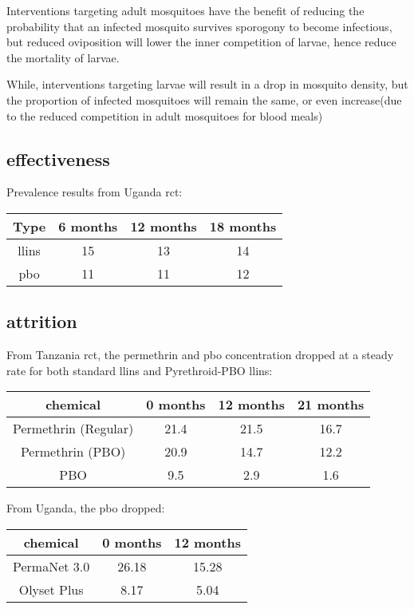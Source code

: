 \documentclass[a4paper, 12pt, twoside]{article}
\begin{document}
Interventions targeting adult mosquitoes have the benefit of reducing the probability that an infected mosquito survives sporogony to become infectious, but reduced oviposition will lower the inner competition of larvae, hence reduce the mortality of larvae.

While, interventions targeting larvae will result in a drop in mosquito density, but the proportion of infected mosquitoes will remain the same, or even increase(due to the reduced competition in adult mosquitoes for blood meals)
\subsection{effectiveness}

Prevalence results from Uganda \gls{rct}\cite{Staedke2020}:
\begin{center}
\begin{tabular}{c c c c}
  Type & 6 months & 12 months & 18 months\\ 
  \hline 
  \gls{llins} & 15 & 13 & 14 \\  
  \gls{pbo} & 11 & 11 & 12\\
\end{tabular}
\end{center}

\subsection{attrition}
From Tanzania\cite{Protopopoff2018} \gls{rct}, the permethrin and \gls{pbo} concentration dropped at a steady rate for both standard \gls{llins} and Pyrethroid-PBO \gls{llins}:

\begin{center}
\begin{tabular}{cccc}
  \toprule
  chemical & 0 months & 12 months & 21 months\\ 
  \midrule
  Permethrin (Regular) & 21.4 & 21.5 & 16.7\\  
  Permethrin (PBO) & 20.9 & 14.7 & 12.2\\
  PBO & 9.5 & 2.9 & 1.6\\
  \bottomrule
\end{tabular}
\end{center}

From Uganda\cite{Staedke2020}, the \gls{pbo} dropped:
\begin{center}
\begin{tabular}{c c c}
  \toprule
  chemical & 0 months & 12 months\\ 
  \midrule
  PermaNet 3.0 & 26.18 & 15.28\\  
  Olyset Plus & 8.17 & 5.04\\  
  \bottomrule
\end{tabular}
\end{center}
\end{document}
